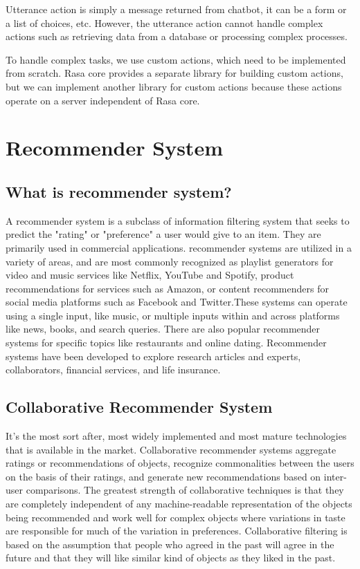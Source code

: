 Utterance action is simply a message returned from chatbot, it can be a form or a list of choices, etc. However, the utterance action cannot handle complex actions such as retrieving data from a database or processing complex processes.

To handle complex tasks, we use custom actions, which need to be implemented from scratch. Rasa core provides a separate library for building custom actions, but we can implement another library for custom actions because these actions operate on a server independent of Rasa core.

\section{Recommender System}

\subsection{What is recommender system?}
A recommender system is a subclass of information filtering system that seeks to predict the "rating" or "preference" a user would give to an item. They are primarily used in commercial applications. recommender systems are utilized in a variety of areas, and are most commonly recognized as playlist generators for video and music services like Netflix, YouTube and Spotify, product recommendations for services such as Amazon, or content recommenders for social media platforms such as Facebook and Twitter.These systems can operate using a single input, like music, or multiple inputs within and across platforms like news, books, and search queries. There are also popular recommender systems for specific topics like restaurants and online dating. Recommender systems have been developed to explore research articles and experts, collaborators, financial services, and life insurance.
\subsection{Collaborative Recommender System}
It’s the most sort after, most widely implemented and most mature technologies that is available in the market. Collaborative recommender systems aggregate ratings or recommendations of objects, recognize commonalities between the users on the basis of their ratings, and generate new recommendations based on inter-user comparisons. The greatest strength of collaborative techniques is that they are completely independent of any machine-readable representation of the objects being recommended and work well for complex objects where variations in taste are responsible for much of the variation in preferences. Collaborative filtering is based on the assumption that people who agreed in the past will agree in the future and that they will like similar kind of objects as they liked in the past.
